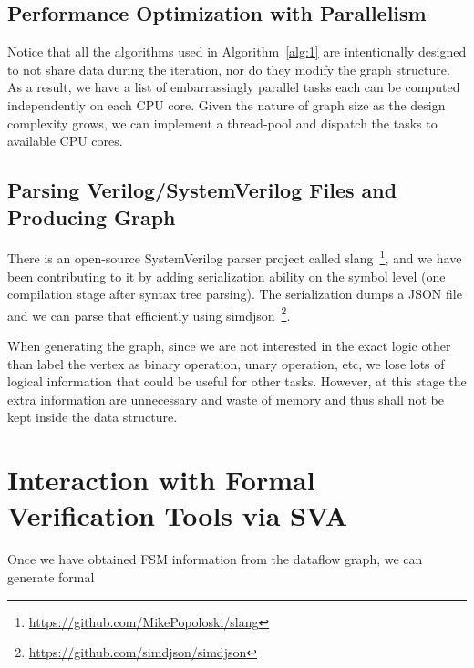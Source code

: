 \documentclass{article}
\begin{document}
\subsection{Performance Optimization with Parallelism}
Notice that all the algorithms used in Algorithm~\ref{alg:1} are intentionally designed to not
share data during the iteration, nor do they modify the graph structure. As a result, we have
a list of embarrassingly parallel tasks each can be computed independently on each CPU core.
Given the nature of graph size as the design complexity grows, we can implement a thread-pool
and dispatch the tasks to available CPU cores.

\subsection{Parsing Verilog/SystemVerilog Files and Producing Graph}
There is an open-source SystemVerilog parser project called
slang~\footnote{\url{https://github.com/MikePopoloski/slang}}, and we have been contributing
to it by adding serialization ability on the symbol level (one compilation stage after syntax
tree parsing). The serialization dumps a JSON file and we can parse that efficiently using
simdjson~\footnote{\url{https://github.com/simdjson/simdjson}}.

When generating the graph, since we are not interested in the exact logic other than label
the vertex as binary operation, unary operation, etc, we lose lots of logical information
that could be useful for other tasks. However, at this stage the extra information are
unnecessary and waste of memory and thus shall not be kept inside the data structure.


\section{Interaction with Formal Verification Tools via SVA}
Once we have obtained FSM information from the dataflow graph, we can generate formal 
\end{document}
